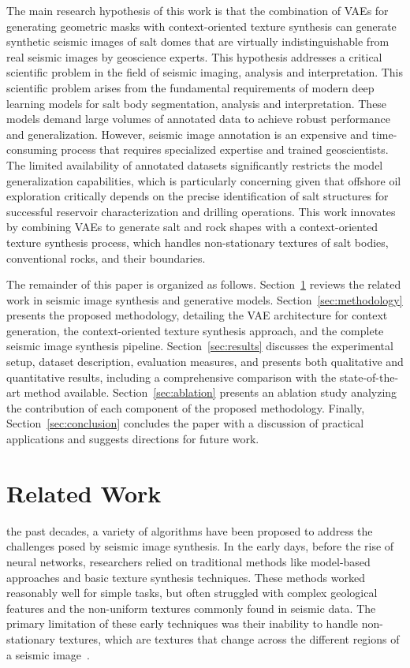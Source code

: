 ﻿\documentclass{ieeeaccess}
\begin{document}
The main research hypothesis of this work is that the combination of VAEs for generating geometric masks with context-oriented texture synthesis can generate synthetic seismic images of salt domes that are virtually indistinguishable from real seismic images by geoscience experts. This hypothesis addresses a critical scientific problem in the field of seismic imaging, analysis and interpretation. This scientific problem arises from the fundamental requirements of modern deep learning models for salt body segmentation, analysis and interpretation. These models demand large volumes of annotated data to achieve robust performance and generalization. However, seismic image annotation is an expensive and time-consuming process that requires specialized expertise and trained geoscientists. The limited availability of annotated datasets significantly restricts the model generalization capabilities, which is particularly concerning given that offshore oil exploration critically depends on the precise identification of salt structures for successful reservoir characterization and drilling operations. This work innovates by combining VAEs to generate salt and rock shapes with a context-oriented texture synthesis process, which handles non-stationary textures of salt bodies, conventional rocks, and their boundaries. 

The remainder of this paper is organized as follows. Section~\ref{sec:related} reviews the related work in seismic image synthesis and generative models. Section~\ref{sec:methodology} presents the proposed methodology, detailing the VAE architecture for context generation, the context-oriented texture synthesis approach, and the complete seismic image  synthesis pipeline. Section~\ref{sec:results} discusses the experimental setup, dataset description, evaluation measures, and presents both qualitative and quantitative results, including a comprehensive comparison with the state-of-the-art method available. Section~\ref{sec:ablation} presents an ablation study analyzing the contribution of each component of the proposed methodology. Finally, Section~\ref{sec:conclusion} concludes the paper with a discussion of practical applications and suggests directions for future work.


\section{Related Work}
\label{sec:related}

 the past decades, a variety of algorithms have been proposed to address the challenges posed by seismic image synthesis. In the early days, before the rise of neural networks, researchers relied on traditional methods like model-based approaches and basic texture synthesis techniques. These methods worked reasonably well for simple tasks,  but often struggled with complex geological features and the non-uniform textures commonly found in seismic data. The primary limitation of these early techniques was their inability to handle non-stationary textures, which are textures that change across the different regions of a seismic image~\cite{Zhou2018}.
\end{document}
